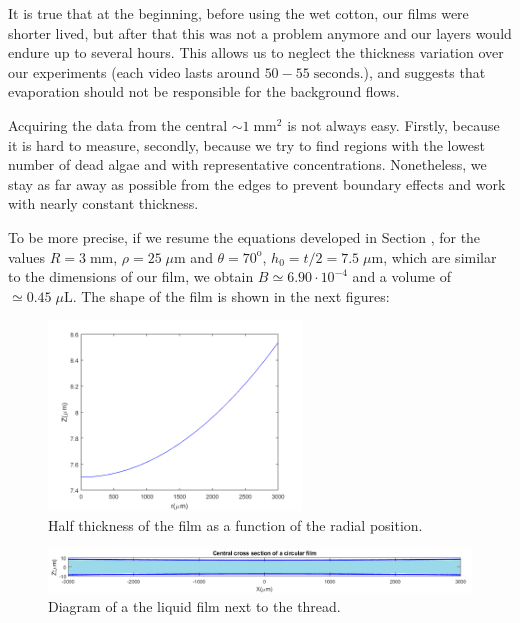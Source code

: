 It is true that at the beginning, before using the wet cotton, our films were shorter lived, but after that this was not a problem anymore and our layers would endure up to several hours. This allows us to neglect the thickness variation over our experiments (each video lasts around $50-55 \; \textrm{seconds}$.), and suggests that evaporation should not be responsible for the background flows.

Acquiring the data from the central $ \sim 1 \; \textrm{mm}^2 $ is not always easy. Firstly, because it is hard to measure, secondly, because we try to find regions with the lowest number of dead algae and with representative concentrations. Nonetheless, we stay as far away as possible from the edges to prevent boundary effects and work with nearly constant thickness.

To be more precise, if we resume the equations developed in Section \label{films}, for the values $R = 3 \; \textrm{mm}$, $\rho = 25 \; \mu \textrm{m}$ and $\theta = 70^\textrm{o}$, $h_0 = t/2 = 7.5 \; \mu \textrm{m}$, which are similar to the dimensions of our film, we obtain $B \simeq 6.90 \cdot 10^{-4}$ and a volume of $ \simeq 0.45 \; \mu \textrm{L}$. The shape of the film is shown in the next figures:

\begin{figure}[H]
	\centering
	\includegraphics[width=0.6\textwidth]{archivos/CircFilmFunction.png}
	\caption{Half thickness of the film as a function of the radial position.}
	\label{CircFilmFunction}
\end{figure}

\begin{figure}[H]
	\centering
	\includegraphics[width=\textwidth]{archivos/CircFilmSection.png}
	\caption{Diagram of a the liquid film next to the thread.}
	\label{CircFilmSection}
\end{figure}


